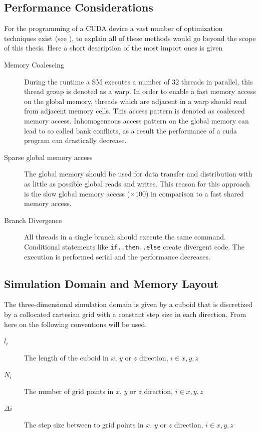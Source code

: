 \subsection{Performance Considerations}

For the programming of a CUDA device a vast number of optimization techniques exist (see \citep{CUDABP}),
to explain all of these methods would go beyond the scope of this thesis.
Here a short description of the most import ones is given

\begin{description}
    \item[Memory Coalescing]
        During the runtime a SM executes a number of 32 threads in parallel, this thread group is denoted as a warp.
        In order to enable a fast memory access on the global memory, threads which are adjacent in a warp should read from adjacent memory cells.
        This access pattern is denoted as coalesced memory access. Inhomogeneous access pattern on the global memory can lead to so called bank
        conflicts, as a result the performance of a cuda program can drastically decrease.

    \item[Sparse global memory access]
        The global memory should be used for data transfer and distribution with as little as possible global reads and writes.
        This reason for this approach is the slow global memory access ($\times 100$) in comparison to a fast shared memory access.

    \item[Branch Divergence] All threads in a single branch should execute the same command.
                              Conditional statements like \texttt{if..then..else} create divergent code.
                              The execution is performed serial and the performance decreases.
\end{description}


\subsection{Simulation Domain and  Memory Layout}

The three-dimensional simulation domain is given by a cuboid that is discretized by a
collocated cartesian grid with a constant step size in each direction.
From here on the following conventions will be used.

\begin{description}
    \item[$l_i$] The length of the cuboid in $x$, $y$ or $z$ direction, $i\in{x, y, z}$
    \item[$N_i$] The number of grid points in $x$, $y$ or $z$ direction, $i\in{x, y, z}$
    \item[$\Delta i$] The step size between to grid points in $x$, $y$ or $z$ direction, $i\in{x, y, z}$
\end{description}

